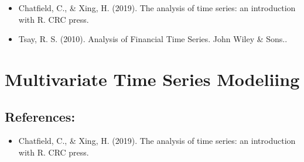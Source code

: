\documentclass[]{book}
\providecommand{\tightlist}{%
  \setlength{\itemsep}{0pt}\setlength{\parskip}{0pt}}
\begin{document}
\begin{itemize}
\item
  Chatfield, C., \& Xing, H. (2019). The analysis of time series: an introduction with R. CRC press.
\item
  Tsay, R. S. (2010). Analysis of Financial Time Series. John Wiley \& Sons..
  \newpage
\end{itemize}

\hypertarget{multivariate-time-series-modeliing}{%
\chapter{Multivariate Time Series Modeliing}\label{multivariate-time-series-modeliing}}


\hypertarget{references-3}{%
\section{References:}\label{references-3}}

\begin{itemize}
\tightlist
\item
  Chatfield, C., \& Xing, H. (2019). The analysis of time series: an introduction with R. CRC press.
\end{itemize}


\end{document}
